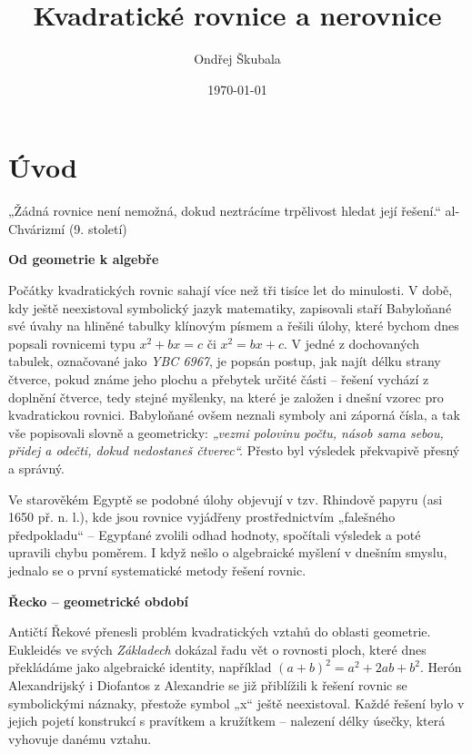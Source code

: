 \documentclass[12pt,a4paper]{article}
\title{Kvadratické rovnice a nerovnice}
\author{Ondřej Škubala}
\date{\today}
\begin{document}
\maketitle
\newpage

\section{Úvod}

\begin{quotebox}
{„Žádná rovnice není nemožná, dokud neztrácíme trpělivost hledat její řešení.“}
{al-Chvárizmí (9. století)}
\end{quotebox}

\begin{historicalbox}
\textbf{Od geometrie k algebře}

Počátky kvadratických rovnic sahají více než tři tisíce let do minulosti. 
V době, kdy ještě neexistoval symbolický jazyk matematiky, 
zapisovali staří Babyloňané své úvahy na hliněné tabulky klínovým písmem a 
řešili úlohy, které bychom dnes popsali rovnicemi typu 
\(x^2 + bx = c\) či \(x^2 = bx + c\). V jedné z dochovaných tabulek, označované 
jako \textit{YBC 6967}, je popsán postup, jak najít délku strany čtverce, 
pokud známe jeho plochu a přebytek určité části – řešení vychází z doplnění čtverce, 
tedy stejné myšlenky, na které je založen i dnešní vzorec pro kvadratickou rovnici.  
Babyloňané ovšem neznali symboly ani záporná čísla, 
a tak vše popisovali slovně a geometricky: 
\textit{„vezmi polovinu počtu, násob sama sebou, přidej a odečti, dokud nedostaneš čtverec“.} 
Přesto byl výsledek překvapivě přesný a správný.

\medskip
Ve starověkém Egyptě se podobné úlohy objevují v tzv. 
Rhindově papyru (asi 1650 př. n. l.), kde jsou rovnice vyjádřeny prostřednictvím 
„falešného předpokladu“ – Egypťané zvolili odhad hodnoty, spočítali výsledek a 
poté upravili chybu poměrem. I když nešlo o algebraické myšlení v dnešním smyslu, 
jednalo se o první systematické metody řešení rovnic.

\medskip
\textbf{Řecko – geometrické období}

Antičtí Řekové přenesli problém kvadratických vztahů do oblasti geometrie. 
Eukleidés ve svých \textit{Základech} dokázal řadu vět o rovnosti ploch, 
které dnes překládáme jako algebraické identity, například \((a+b)^2 = a^2 + 2ab + b^2\). 
Herón Alexandrijský i Diofantos z Alexandrie se již přiblížili k řešení rovnic 
se symbolickými náznaky, přestože symbol „x“ ještě neexistoval. 
Každé řešení bylo v jejich pojetí konstrukcí s pravítkem a kružítkem – 
nalezení délky úsečky, která vyhovuje danému vztahu.


\end{historicalbox}
\end{document}
